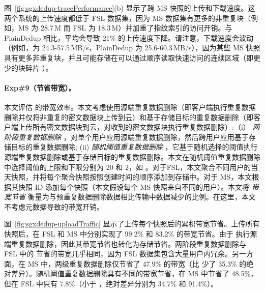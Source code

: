 图~\ref{fig:sgxdedup-tracePerformance}(b) 显示了跨 MS 快照的上传和下载速度。这两个系统的上传速度都低于 FSL 数据集，因为 MS 数据集有更多的非重复块（例如，MS 为 28.7\,M 而 FSL 为 18.3\,M）并加重了指纹索引的访问开销。与 PlainDedup 相比，\sysnameS 平均会导致 21\% 的上传速度下降。请注意，下载速度会波动（例如，\sysnameS 为 24.3-57.5\,MB/s，PlainDedup 为 25.6-60.3\,MB/s），因为某些 MS 快照具有更多非重复块，并且可能存储在可以通过顺序读取快速访问的连续区域（即更少的块碎片 \cite{lillibridge13}）。

\paragraph*{Exp\#9（节省带宽）。} 本文评估 \sysnameS 的带宽效率。本文考虑使用源端重复数据删除（即客户端执行重复数据删除并仅将非重复的密文数据块上传到云）和基于存储目标的重复数据删除（即客户端上传所有密文数据块到云，对收到的密文数据块执行重复数据删除）:（i）\textit{ 两阶段重复数据删除} \cite{li15}，对单个用户应用源端重复数据删除，然后跨用户应用基于存储目标的重复数据删除; (ii) \textit{ 随机阈值重复数据删除} \cite{harnik2010side}，它基于随机选择的阈值执行源端重复数据删除或基于存储目标的重复数据删除。本文在随机阈值重复数据删除中选择阈值的上限和下限分别为 20 和 2，如 \cite{harnik2010side}。对于FSL，本文聚合不同用户的当天快照，并将每个聚合快照按照创建时间的顺序添加到存储中。对于 MS，本文根据其快照 ID 添加每个快照（本文假设每个 MS 快照来自不同的用户）。本文将 \textit{ 带宽节省} 衡量为与预重复数据删除数据相比传输中数据减少的比例。在这里，本文不考虑元数据导致的带宽开销。

图~\ref{fig:sgxdedup-uploadTraffic} 显示了上传每个快照后的累积带宽节省。上传所有快照后，\sysnameS 在 FSL 和 MS 中分别实现了 99.2\% 和 83.2\% 的带宽节省。由于 \sysnameS 执行源端重复数据删除，因此其带宽节省也转化为存储节省。两阶段重复数据删除与 FSL 中的 \sysnameS 节省的带宽几乎相同，因为 FSL 数据集包含大量用户内冗余。另一方面，在 MS 中，两级重复数据删除仅节省了 47.9\% 的带宽（比 \sysnameS 少了 35.3\% 的绝对差异）。随机阈值重复数据删除具有不同的带宽节省，在 MS 中节省了 48.5\%，但在 FSL 中只有 7.8\%（小于 \sysnameS，绝对差异分别为 34.7\% 和 91.4\%）。

